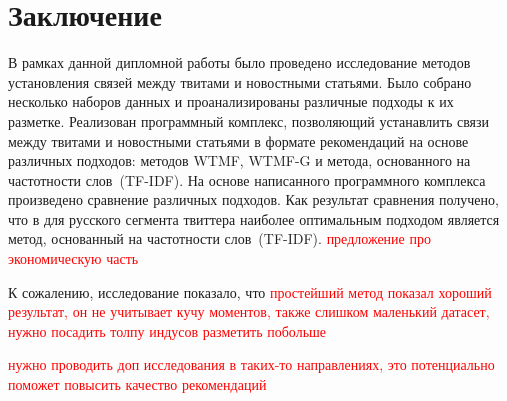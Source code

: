 \section*{Заключение}
    В рамках данной дипломной работы было проведено исследование методов установления связей между твитами и новостными статьями.
    Было собрано несколько наборов данных и проанализированы различные подходы к их разметке.
    Реализован программный комплекс, позволяющий устанавлить связи между твитами и новостными статьями в формате рекомендаций на основе различных подходов: методов WTMF, WTMF-G и метода, основанного на частотности слов~(TF-IDF).
    На основе написанного программного комплекса произведено сравнение различных подходов. Как результат сравнения получено, что в для русского сегмента твиттера наиболее оптимальным подходом является метод, основанный на частотности слов~(TF-IDF). \textcolor{red}{предложение про экономическую часть}

    К сожалению, исследование показало, что \textcolor{red}{простейший метод показал хороший результат, он не учитывает кучу моментов, также слишком маленький датасет, нужно посадить толпу индусов разметить побольше}

    \textcolor{red}{нужно проводить доп исследования в таких-то направлениях, это потенциально поможет повысить качество рекомендаций}

    